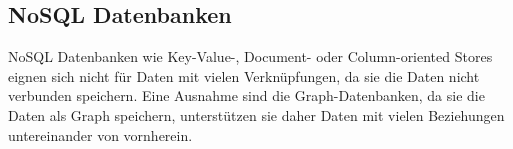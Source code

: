 \subsection{NoSQL Datenbanken}
\ac{NoSQL} Datenbanken wie Key-Value-, Document- oder Column-oriented Stores eignen sich nicht für Daten mit vielen Verknüpfungen, da sie die Daten nicht verbunden speichern. Eine Ausnahme sind die Graph-Datenbanken, da sie die Daten als Graph speichern, unterstützen sie daher Daten mit vielen Beziehungen untereinander von vornherein. \cite{robinsongraph:2015}

\cite{jaiswal2013comparative}
\cite{vicknair2010comparison}



